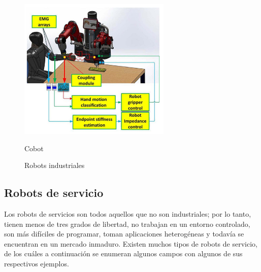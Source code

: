 \begin{figure}[ht!]
\begin{minipage}{0.44\linewidth}
	\end{minipage}
	\hspace{1cm}
	\begin{minipage}{0.4\linewidth}
		\centering
		\includegraphics[width=\linewidth]{figs/cobot.png}
		\caption*{\centering Cobot}
		
	\end{minipage}
	\caption{Robots industriales}
	\label{fig:robindustriales}
\end{figure}

\setcounter{footnote}{5} %


\subsection{Robots de servicio}
\label{subsec:robotservicio}

Los robots de servicios son todos aquellos que no son industriales; por lo tanto, tienen menos de tres grados de libertad, no trabajan en un entorno controlado, son más difíciles de programar, toman aplicaciones heterogéneas y todavía se encuentran en un mercado inmaduro. Existen muchos tipos de robots de servicio, de los cuáles a continuación se enumeran algunos campos con algunos de sus respectivos ejemplos.



